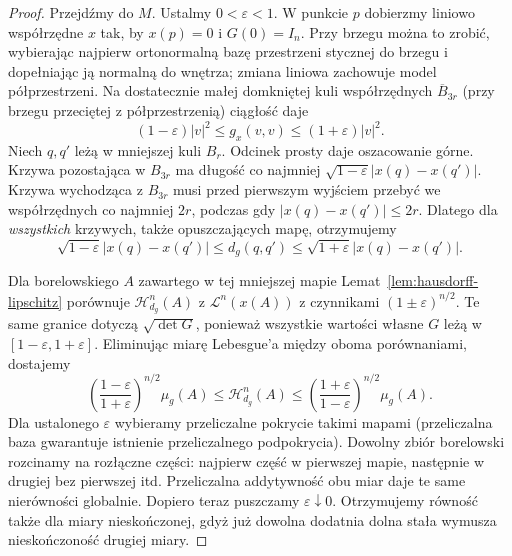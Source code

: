 \begin{proof}
Przejdźmy do $M$. Ustalmy $0<\varepsilon<1$.
W punkcie $p$ dobierzmy liniowo współrzędne $x$ tak,
by $x(p)=0$ i $G(0)=I_n$. Przy brzegu można to zrobić,
wybierając najpierw ortonormalną bazę przestrzeni stycznej
do brzegu i dopełniając ją normalną do wnętrza;
zmiana liniowa zachowuje model półprzestrzeni.
Na dostatecznie małej domkniętej kuli współrzędnych
$\overline B_{3r}$ (przy brzegu przeciętej z półprzestrzenią)
ciągłość daje
\[
 (1-\varepsilon)|v|^2\leq g_x(v,v)
                         \leq(1+\varepsilon)|v|^2.
\]
Niech $q,q'$ leżą w mniejszej kuli $B_r$.
Odcinek prosty daje oszacowanie górne. Krzywa pozostająca
w $B_{3r}$ ma długość co najmniej
$\sqrt{1-\varepsilon}|x(q)-x(q')|$.
Krzywa wychodząca z $B_{3r}$ musi przed pierwszym wyjściem
przebyć we współrzędnych co najmniej $2r$, podczas gdy
$|x(q)-x(q')|\leq2r$. Dlatego dla \emph{wszystkich}
krzywych, także opuszczających mapę, otrzymujemy
\begin{equation}\label{eq:metryka-lokalnie-blisko-euklidesowej}
 \sqrt{1-\varepsilon}|x(q)-x(q')|
 \leq d_g(q,q')
 \leq\sqrt{1+\varepsilon}|x(q)-x(q')|.
\end{equation}

Dla borelowskiego $A$ zawartego w tej mniejszej mapie
Lemat~\ref{lem:hausdorff-lipschitz} porównuje
$\mathcal H^n_{d_g}(A)$ z $\mathcal L^n(x(A))$
z czynnikami $(1\pm\varepsilon)^{n/2}$.
Te same granice dotyczą $\sqrt{\det G}$, ponieważ
wszystkie wartości własne $G$ leżą w
$[1-\varepsilon,1+\varepsilon]$. Eliminując miarę
Lebesgue'a między oboma porównaniami, dostajemy
\[
 \left(\frac{1-\varepsilon}{1+\varepsilon}\right)^{n/2}\mu_g(A)
 \leq\mathcal H^n_{d_g}(A)
 \leq\left(\frac{1+\varepsilon}{1-\varepsilon}\right)^{n/2}\mu_g(A).
\]
Dla ustalonego $\varepsilon$ wybieramy przeliczalne
pokrycie takimi mapami (przeliczalna baza gwarantuje
istnienie przeliczalnego podpokrycia). Dowolny zbiór
borelowski rozcinamy na rozłączne części: najpierw część
w pierwszej mapie, następnie w drugiej bez pierwszej itd.
Przeliczalna addytywność obu miar daje te same nierówności
globalnie. Dopiero teraz puszczamy $\varepsilon\downarrow0$.
Otrzymujemy równość także dla miary nieskończonej,
gdyż już dowolna dodatnia dolna stała wymusza
nieskończoność drugiej miary.


\end{proof}
